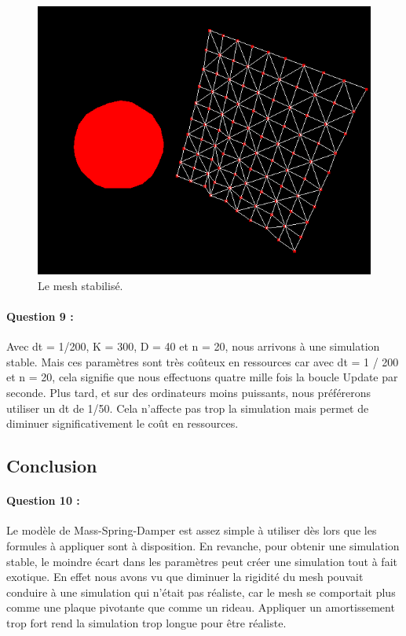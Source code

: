 \documentclass[a4paper,12pt]{article}
\begin{document}
\begin{figure}[ht!]
  \centering
  \includegraphics[scale=0.62]{images/rideau_fin.png}
  \caption{Le mesh stabilisé.}
  \label{fig:rideauFell}
\end{figure}

\paragraph{Question 9 :} 	Avec dt = 1/200, K = 300, D = 40 et n = 20, nous arrivons à une simulation stable. Mais ces paramètres sont très coûteux en ressources car avec dt = 1 / 200 et n = 20, cela signifie que nous effectuons quatre mille fois la boucle \og{}Update\fg{} par seconde. Plus tard, et sur des ordinateurs moins puissants, nous préférerons utiliser un dt de 1/50. Cela n'affecte pas trop la simulation mais permet de diminuer significativement le coût en ressources.

\subsection{Conclusion}
\paragraph{Question 10 :} Le modèle de Mass-Spring-Damper est assez simple à utiliser dès lors que les formules à appliquer sont à disposition. En revanche, pour obtenir une simulation stable, le moindre écart dans les paramètres peut créer une simulation tout à fait exotique. En effet nous avons vu que diminuer la rigidité du mesh pouvait conduire à une simulation qui n'était pas réaliste, car le mesh se comportait plus comme une plaque pivotante que comme un rideau. Appliquer un amortissement trop fort rend la simulation trop longue pour être réaliste.
\end{document}
